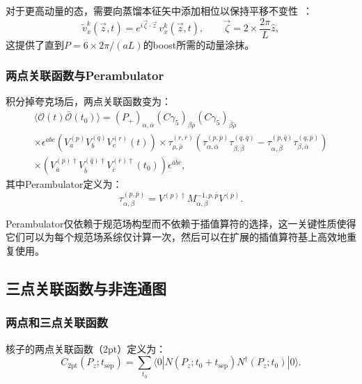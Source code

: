 \documentclass[12pt,a4paper]{ctexart}
\theoremstyle{definition}
\newcommand{\tsep}{t_{\text{sep}}}
\newcommand{\Pz}{P_z}
\begin{document}
对于更高动量的态，需要向蒸馏本征矢中添加相位以保持平移不变性~\cite{Egerer:2020xma}：
\begin{equation}\label{eq:momentum_smearing}
    \tilde{v}^k_x(\vec{z},t) = e^{i\vec{\zeta}\cdot\vec{z}} \, v^k_x(\vec{z},t), \qquad \vec{\zeta} = 2 \times \frac{2\pi}{L} \hat{z},
\end{equation}
这提供了直到$P = 6 \times 2\pi/(aL)$的boost所需的动量涂抹。

\subsubsection{两点关联函数与Perambulator}

积分掉夸克场后，两点关联函数变为：
\begin{multline}\label{eq:C2pt_dist}
    \langle \mathcal{O}(t) \bar{\mathcal{O}}(t_0) \rangle = (P_+)_{\alpha,\bar{\alpha}} (C\gamma_5)_{\beta\rho} (C\gamma_5)_{\bar{\beta}\bar{\rho}} \\
    \times \epsilon^{abc} \left(V^{(p)}_a V^{(q)}_b V^{(r)}_c(t)\right)
    \times \tau^{(r,\bar{r})}_{\rho,\bar{\rho}} \left(\tau^{(p,\bar{p})}_{\alpha,\bar{\alpha}} \tau^{(q,\bar{q})}_{\beta,\bar{\beta}} - \tau^{(p,\bar{q})}_{\alpha,\bar{\beta}} \tau^{(q,\bar{p})}_{\beta,\bar{\alpha}}\right) \\
    \times \left(V^{(\bar{p})\dagger}_{\bar{a}} V^{(\bar{q})\dagger}_{\bar{b}} V^{(\bar{r})\dagger}_{\bar{c}}(t_0)\right) \epsilon^{\bar{a}\bar{b}\bar{c}},
\end{multline}
其中Perambulator定义为：
\begin{equation}\label{eq:perambulator}
    \tau^{(p,\bar{p})}_{\alpha,\beta} = V^{(p)\dagger} M^{-1,p,\bar{p}}_{\alpha,\beta} V^{(\bar{p})}.
\end{equation}

Perambulator仅依赖于规范场构型而不依赖于插值算符的选择，这一关键性质使得它们可以为每个规范场系综仅计算一次，然后可以在扩展的插值算符基上高效地重复使用。

\subsection{三点关联函数与非连通图}

\subsubsection{两点和三点关联函数}

核子的两点关联函数（2pt）定义为：
\begin{equation}\label{eq:C2pt}
    C_{2\text{pt}}(\Pz; \tsep) = \sum_{t_0} \langle 0 | N(\Pz; t_0 + \tsep) N^\dagger(\Pz; t_0) | 0 \rangle.
\end{equation}
\end{document}
